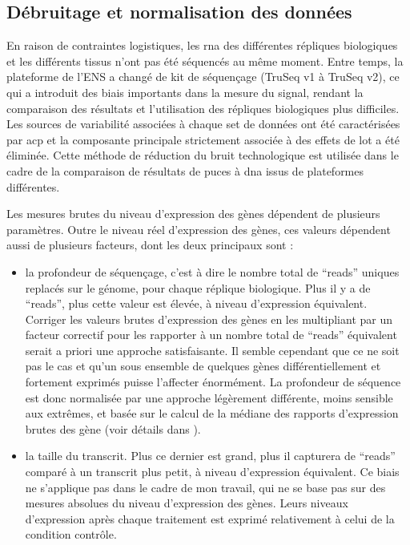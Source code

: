 \documentclass[../main.tex]{subfiles}
\begin{document}
\subsection{Débruitage et normalisation des données}
En raison de contraintes logistiques, les \gls{rna} des différentes répliques biologiques et les différents tissus n'ont pas été séquencés au même moment.
Entre temps, la plateforme de l'ENS a changé de kit de séquençage (TruSeq v1 à TruSeq v2), ce qui a introduit des biais importants dans la mesure du signal, rendant la comparaison des résultats et l'utilisation des répliques biologiques plus difficiles.
Les sources de variabilité associées à chaque set de données ont été caractérisées par \gls{acp} et la composante principale strictement associée à des effets de lot a été éliminée.
Cette méthode de réduction du bruit technologique est utilisée dans le cadre de la comparaison de résultats de puces à \gls{dna} issus de plateformes différentes.
\par
Les mesures brutes du niveau d'expression des gènes dépendent de plusieurs paramètres.
Outre le niveau réel d'expression des gènes, ces valeurs dépendent aussi de plusieurs facteurs, dont les deux principaux sont :
\begin{itemize}
\item la profondeur de séquençage, c'est à dire le nombre total de ``reads'' uniques replacés sur le génome, pour chaque réplique biologique.
Plus il y a de ``reads'', plus cette valeur est élevée, à niveau d'expression équivalent. Corriger les valeurs brutes d'expression des gènes en les multipliant par un facteur correctif pour les rapporter à un nombre total de ``reads'' équivalent serait a priori une approche satisfaisante.
Il semble cependant que ce ne soit pas le cas et qu'un sous ensemble de quelques gènes différentiellement et fortement exprimés puisse l'affecter énormément.
La profondeur de séquence est donc normalisée par une approche légèrement différente, moins sensible aux extrêmes, et basée sur le calcul de la médiane des rapports d'expression brutes des gène (voir détails dans \citealp{Anders2010}).
\item la taille du transcrit. Plus ce dernier est grand, plus il capturera de ``reads'' comparé à un transcrit plus petit, à niveau d'expression équivalent.
Ce biais ne s'applique pas dans le cadre de mon travail, qui ne se base pas sur des mesures absolues du niveau d'expression des gènes.
Leurs niveaux d'expression après chaque traitement est exprimé relativement à celui de la condition contrôle.
\end{itemize}
\end{document}
